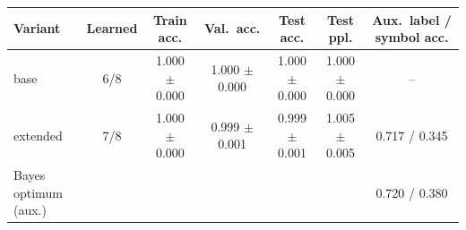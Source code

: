 \begin{tabular}{@{}lcccccc@{}}
\toprule
Variant & Learned & Train acc. & Val.\ acc. & Test acc. & Test ppl. & Aux.\ label / symbol acc.\\
\midrule
base & 6/8 & 1.000 $\pm$ 0.000 & 1.000 $\pm$ 0.000 & 1.000 $\pm$ 0.000 & 1.000 $\pm$ 0.000 & -- \\
extended & 7/8 & 1.000 $\pm$ 0.000 & 0.999 $\pm$ 0.001 & 0.999 $\pm$ 0.001 & 1.005 $\pm$ 0.005 & 0.717 / 0.345 \\
\midrule
Bayes optimum (aux.) & & & & & & 0.720 / 0.380 \\
\bottomrule
\end{tabular}
